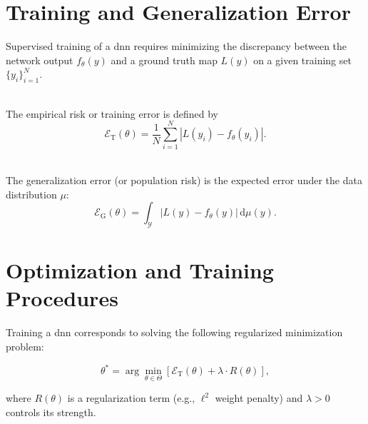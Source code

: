\section{Training and Generalization Error}
\label{sec:dnn-error}

Supervised training of a \ac{dnn} requires minimizing the discrepancy between
the network output $f_\theta(y)$ and a ground truth map $L(y)$ on a given
training set $\{y_i\}_{i=1}^N$.

\begin{definition} \ \\
The empirical risk or training error is defined by
 \begin{equation*}
\mathcal{E}_\mathrm{T}(\theta) = \frac{1}{N} \sum_{i=1}^N |L(y_i) - f_\theta(y_i)|.
 \end{equation*}
\end{definition}

\begin{definition} \ \\
The generalization error (or population risk) is the expected error under the
data distribution $\mu$:
 \begin{equation*}
\mathcal{E}_\mathrm{G}(\theta) = \int_{\mathcal{Y}} |L(y) - f_\theta(y)| \, \mathrm{d}\mu(y).
 \end{equation*}
\end{definition}


\section{Optimization and Training Procedures}
\label{sec:dnn-training}

Training a \ac{dnn} corresponds to solving the following regularized
minimization problem:

\begin{equation}
    \theta^* = \arg\min_{\theta \in \Theta} \left[ \mathcal{E}_\mathrm{T}(\theta) + \lambda \cdot R(\theta) \right],
    \label{eq:regularized-objective}
\end{equation}

where $R(\theta)$ is a regularization term (e.g., $\ell^2$ weight penalty) and
$\lambda > 0$ controls its strength.

